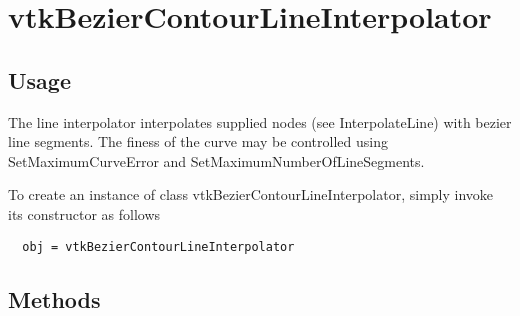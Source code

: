 \section{vtkBezierContourLineInterpolator}

\subsection{Usage}

 The line interpolator interpolates supplied nodes (see InterpolateLine)
 with bezier line segments. The finess of the curve may be controlled using
 SetMaximumCurveError and SetMaximumNumberOfLineSegments.


To create an instance of class vtkBezierContourLineInterpolator, simply
invoke its constructor as follows
\begin{verbatim}
  obj = vtkBezierContourLineInterpolator
\end{verbatim}
\subsection{Methods}

